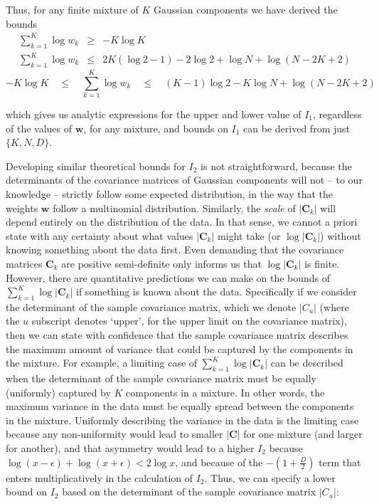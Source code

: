 \documentclass{elsarticle}
\newcommand{\vect}[1]{\boldsymbol{\mathbf{#1}}}
\renewcommand{\vec}[1]{\vect{#1}}
\def\cov{C}
\def\veccov{\vect{\cov}}
\def\weight{w}
\def\weights{\vect{\weight}}
\begin{document}
\noindent{}Thus, for any finite mixture of $K$ Gaussian components we have 
derived the bounds
\begin{eqnarray}
\sum_{k=1}^{K}\log\weight_k & \geq & -K\log{K} \nonumber \\
\sum_{k=1}^{K}\log\weight_k & \leq & 2K\left(\log{2} - 1\right) - 2\log{2} + \log{N} + \log{\left(N - 2K + 2\right)} \nonumber
\end{eqnarray}
\begin{equation}
-K\log{K} \quad \leq \quad \sum_{k=1}^{K}\log\weight_k \quad \leq \quad (K - 1)\log{2} - K\log{N} + \log{(N - 2K + 2)}
\end{equation}

\noindent{}which gives us analytic expressions for the upper and lower value 
of $I_1$, regardless of the values of $\vec{\weight}$, for any mixture, and
bounds on $I_{1}$ can be derived from just $\{K, N, D\}$.


Developing similar theoretical bounds for $I_2$ is not straightforward, because
the determinants of the covariance matrices of Gaussian components will not
-- to our knowledge -- strictly follow some expected distribution, in the way 
that the weights $\weights$ follow a multinomial distribution. Similarly, the
\emph{scale} of $|\veccov_k|$ will depend entirely on the distribution of the
data. In that sense, we cannot a priori state with any certainty about what 
values $|\veccov_k|$ might take (or $\log{|\veccov_k|}$) without knowing
something about the data first. Even demanding that the covariance matrices
$\veccov_k$ are positive semi-definite only informs us that $\log{|\veccov_k|}$
is finite. However, there are quantitative predictions we can make on the 
bounds of $\sum_{k=1}^{K}\log{|\veccov_k|}$ if something is known about the
data. Specifically if we consider the determinant of the sample covariance 
matrix, which we denote $|\cov_{u}|$ (where the $u$ subscript denotes `upper',
for the upper limit on the covariance matrix), then we can state with confidence that
the sample covariance matrix describes the maximum amount of variance that 
could be captured by the components in the mixture. For example, a limiting
case of $\sum_{k=1}^{K}\log{|\veccov_k|}$ can be described when the determinant
of the sample covariance matrix must be equally (uniformly) captured by $K$ 
components in a mixture. In other words, the maximum variance in the data 
must be equally spread between the components in the mixture. Uniformly 
describing the variance in the data is the limiting case because any 
non-uniformity would lead to smaller $|\veccov|$ for one mixture (and larger 
for another), and that asymmetry would lead to a higher $I_2$ because 
$\log(x - \epsilon) + \log(x + \epsilon) < 2\log{x}$, and because of the 
$-(1 + \frac{D}{2})$ term that enters multiplicatively in the calculation of 
$I_2$. Thus, we can specify a lower bound on $I_2$ based on the determinant of
the sample covariance matrix $|\cov_{u}|$:
\end{document}
